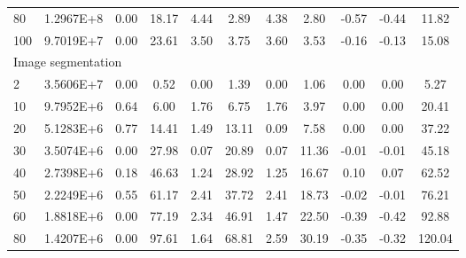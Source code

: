 {\begin{longtable}{@{}llccccccccc@{}}
\multicolumn{1}{l|}{80}  & \multicolumn{1}{l|}{1.2967E+8}  & 0.00 & \multicolumn{1}{c|}{18.17}   & 4.44 & \multicolumn{1}{c|}{2.89}    & 4.38 & \multicolumn{1}{c|}{2.80}    & -0.57     & -0.44     & 11.82   \\
\multicolumn{1}{l|}{100} & \multicolumn{1}{l|}{9.7019E+7}  & 0.00 & \multicolumn{1}{c|}{23.61}   & 3.50 & \multicolumn{1}{c|}{3.75}    & 3.60 & \multicolumn{1}{c|}{3.53}    & -0.16     & -0.13     & 15.08   \\ \hline
\multicolumn{11}{l}{Image segmentation}                                                                                                                                                                        \\ \hline
\multicolumn{1}{l|}{2}   & \multicolumn{1}{l|}{3.5606E+7}  & 0.00 & \multicolumn{1}{c|}{0.52}    & 0.00 & \multicolumn{1}{c|}{1.39}    & 0.00 & \multicolumn{1}{c|}{1.06}    & 0.00      & 0.00      & 5.27    \\
\multicolumn{1}{l|}{10}  & \multicolumn{1}{l|}{9.7952E+6}  & 0.64 & \multicolumn{1}{c|}{6.00}    & 1.76 & \multicolumn{1}{c|}{6.75}    & 1.76 & \multicolumn{1}{c|}{3.97}    & 0.00      & 0.00      & 20.41   \\
\multicolumn{1}{l|}{20}  & \multicolumn{1}{l|}{5.1283E+6}  & 0.77 & \multicolumn{1}{c|}{14.41}   & 1.49 & \multicolumn{1}{c|}{13.11}   & 0.09 & \multicolumn{1}{c|}{7.58}    & 0.00      & 0.00      & 37.22   \\
\multicolumn{1}{l|}{30}  & \multicolumn{1}{l|}{3.5074E+6}  & 0.00 & \multicolumn{1}{c|}{27.98}   & 0.07 & \multicolumn{1}{c|}{20.89}   & 0.07 & \multicolumn{1}{c|}{11.36}   & -0.01     & -0.01     & 45.18   \\
\multicolumn{1}{l|}{40}  & \multicolumn{1}{l|}{2.7398E+6}  & 0.18 & \multicolumn{1}{c|}{46.63}   & 1.24 & \multicolumn{1}{c|}{28.92}   & 1.25 & \multicolumn{1}{c|}{16.67}   & 0.10      & 0.07      & 62.52   \\
\multicolumn{1}{l|}{50}  & \multicolumn{1}{l|}{2.2249E+6}  & 0.55 & \multicolumn{1}{c|}{61.17}   & 2.41 & \multicolumn{1}{c|}{37.72}   & 2.41 & \multicolumn{1}{c|}{18.73}   & -0.02     & -0.01     & 76.21   \\
\multicolumn{1}{l|}{60}  & \multicolumn{1}{l|}{1.8818E+6}  & 0.00 & \multicolumn{1}{c|}{77.19}   & 2.34 & \multicolumn{1}{c|}{46.91}   & 1.47 & \multicolumn{1}{c|}{22.50}   & -0.39     & -0.42     & 92.88   \\
\multicolumn{1}{l|}{80}  & \multicolumn{1}{l|}{1.4207E+6}  & 0.00 & \multicolumn{1}{c|}{97.61}   & 1.64 & \multicolumn{1}{c|}{68.81}   & 2.59 & \multicolumn{1}{c|}{30.19}   & -0.35     & -0.32     & 120.04  \\

\end{longtable}}
